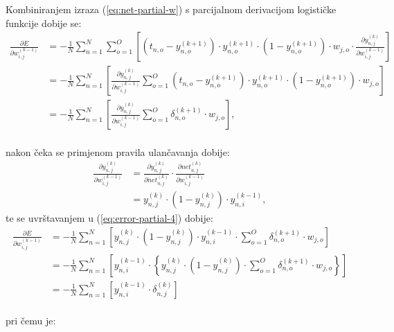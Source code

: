 Kombiniranjem izraza (\ref{eq:net-partial-w}) s parcijalnom derivacijom logističke funkcije dobije se:\\
\begin{align}
    \frac{\partial E}{\partial w_{i, j}^{(k - 1)}} & = -\frac{1}{N} \sum_{n = 1}^{N} \sum_{o = 1}^{O} \left[
    \left(t_{n, o} - y_{n, o}^{(k + 1)}\right) \cdot y_{n, o}^{(k + 1)} \cdot (1 - y_{n, o}^{(k + 1)}) \cdot w_{j, o}
    \cdot \frac{\partial y_{n, j}^{(k)}}{\partial w_{i, j}^{(k - 1)}}\right]\\
    & = -\frac{1}{N} \sum_{n = 1}^{N} \left[\frac{\partial y_{n, j}^{(k)}}{\partial w_{i, j}^{(k - 1)}}
    \sum_{o = 1}^{O} \left(t_{n, o} - y_{n, o}^{(k + 1)}\right) \cdot y_{n, o}^{(k + 1)} \cdot
    (1 - y_{n, o}^{(k + 1)}) \cdot w_{j, o}\right]\\
    & = -\frac{1}{N} \sum_{n = 1}^{N} \left[\frac{\partial y_{n, j}^{(k)}}{\partial w_{i, j}^{(k - 1)}}
    \sum_{o = 1}^{O} \delta_{n, o}^{(k + 1)} \cdot w_{j, o}\right],\label{eq:error-partial-4}
\end{align}\\
nakon čeka se primjenom pravila ulančavanja dobije:\\
\begin{align}
    \frac{\partial y_{n, j}^{(k)}}{\partial w_{i, j}^{(k - 1)}} & =
    \frac{\partial y_{n, j}^{(k)}}{\partial net_{n, j}^{(k)}} \cdot
    \frac{\partial net_{n, j}^{(k)}}{\partial w_{i, j}^{(k - 1)}}\\
    & = y_{n, j}^{(k)} \cdot (1 - y_{n, j}^{(k)}) \cdot y_{n, i}^{(k - 1)},\label{eq:y-partial-w-2}
\end{align}
te se uvrštavanjem u (\ref{eq:error-partial-4}) dobije:\\
\begin{align}
    \frac{\partial E}{\partial w_{i, j}^{(k - 1)}} & = -\frac{1}{N} \sum_{n = 1}^{N} \left[
    y_{n, j}^{(k)} \cdot (1 - y_{n, j}^{(k)}) \cdot y_{n, i}^{(k - 1)} \cdot \sum_{o = 1}^{O} \delta_{n, o}^{(k + 1)}
    \cdot w_{j, o}\right]\\
    & = -\frac{1}{N} \sum_{n = 1}^{N} \left[y_{n, i}^{(k - 1)} \cdot \left\{y_{n, j}^{(k)} \cdot (1 - y_{n, j}^{(k)})
    \cdot \sum_{o = 1}^{O} \delta_{n, o}^{(k + 1)} \cdot w_{j, o}\right\}\right]\\
    & = -\frac{1}{N} \sum_{n = 1}^{N} \left[y_{n, i}^{(k - 1)} \cdot \delta_{n, j}^{(k)}\right]
    \label{eq:error-partial-5}
\end{align}\\
pri čemu je:\\
